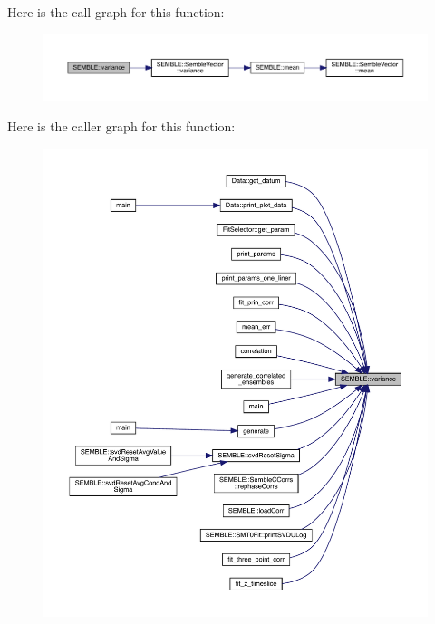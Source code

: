 Here is the call graph for this function\+:
\nopagebreak
\begin{figure}[H]
\begin{center}
\leavevmode
\includegraphics[width=350pt]{d7/dfd/namespaceSEMBLE_a539a8eda87a4bdc8855dd9d5d2a2fb3a_cgraph}
\end{center}
\end{figure}
Here is the caller graph for this function\+:
\nopagebreak
\begin{figure}[H]
\begin{center}
\leavevmode
\includegraphics[width=350pt]{d7/dfd/namespaceSEMBLE_a539a8eda87a4bdc8855dd9d5d2a2fb3a_icgraph}
\end{center}
\end{figure}
\mbox{\label{namespaceSEMBLE_a68dde1a91ae631873d4f3816c77c9eaf}} 
